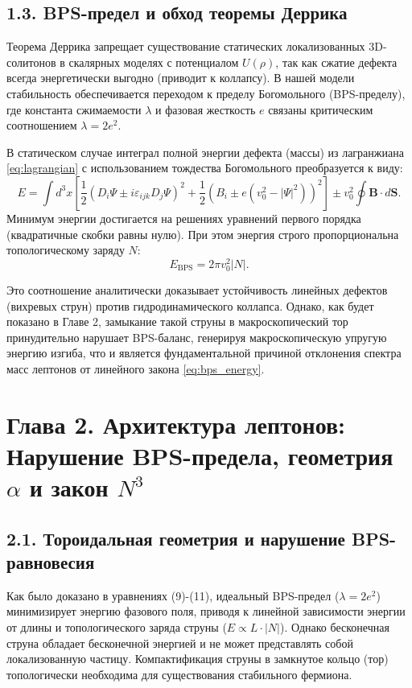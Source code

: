 \documentclass[12pt,a4paper]{article}
\begin{document}
	\subsection{1.3. BPS-предел и обход теоремы Деррика}
	Теорема Деррика запрещает существование статических локализованных 3D-солитонов в скалярных моделях с потенциалом $U(\rho)$, так как сжатие дефекта всегда энергетически выгодно (приводит к коллапсу). 
	В нашей модели стабильность обеспечивается переходом к пределу Богомольного (BPS-пределу), где константа сжимаемости $\lambda$ и фазовая жесткость $e$ связаны критическим соотношением $\lambda = 2e^2$.
	
	В статическом случае интеграл полной энергии дефекта (массы) из лагранжиана \eqref{eq:lagrangian} с использованием тождества Богомольного преобразуется к виду:
	\begin{equation}
		E = \int d^3x \left[ \frac{1}{2} \left( D_i \Psi \pm i \varepsilon_{ijk} D_j \Psi \right)^2 + \frac{1}{2} \left( B_i \pm e(v_0^2 - |\Psi|^2) \right)^2 \right] \pm v_0^2 \oint \mathbf{B} \cdot d\mathbf{S}.
	\end{equation}
	Минимум энергии достигается на решениях уравнений первого порядка (квадратичные скобки равны нулю). При этом энергия строго пропорциональна топологическому заряду $N$:
	\begin{equation}
		E_{\text{BPS}} = 2\pi v_0^2 |N|.
		\label{eq:bps_energy}
	\end{equation}
	
	Это соотношение аналитически доказывает устойчивость линейных дефектов (вихревых струн) против гидродинамического коллапса. Однако, как будет показано в Главе 2, замыкание такой струны в макроскопический тор принудительно нарушает BPS-баланс, генерируя макроскопическую упругую энергию изгиба, что и является фундаментальной причиной отклонения спектра масс лептонов от линейного закона \eqref{eq:bps_energy}.
	
	\section{Глава 2. Архитектура лептонов: Нарушение BPS-предела, геометрия $\alpha$ и закон $N^3$}
	
	\subsection{2.1. Тороидальная геометрия и нарушение BPS-равновесия}
	Как было доказано в уравнениях (9)-(11), идеальный BPS-предел ($\lambda = 2e^2$) минимизирует энергию фазового поля, приводя к линейной зависимости энергии от длины и топологического заряда струны ($E \propto L \cdot |N|$). Однако бесконечная струна обладает бесконечной энергией и не может представлять собой локализованную частицу. Компактификация струны в замкнутое кольцо (тор) топологически необходима для существования стабильного фермиона.
	
\end{document}
